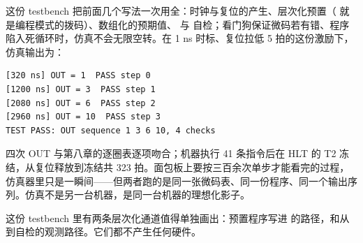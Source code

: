 这份 testbench 把前面几个写法一次用全：时钟与复位的产生、层次化预置（ 就是编程模式的拨码）、数组化的预期值、 与  自检；看门狗保证微码若有错、程序陷入死循环时，仿真不会无限空转。在 1 ns 时标、复位拉低 5 拍的这份激励下，仿真输出为：

\begin{lstlisting}
[320 ns] OUT = 1  PASS step 0
[1200 ns] OUT = 3  PASS step 1
[2080 ns] OUT = 6  PASS step 2
[2960 ns] OUT = 10  PASS step 3
TEST PASS: OUT sequence 1 3 6 10, 4 checks
\end{lstlisting}

四次 OUT 与第八章的逐圈表逐项吻合；机器执行 41 条指令后在 HLT 的 T2 冻结，从复位释放到冻结共 323 拍。面包板上要按三百余次单步才能看完的过程，仿真器里只是一瞬间——但两者跑的是同一张微码表、同一份程序、同一个输出序列。仿真不是另一台机器，是同一台机器的理想化影子。

这份 testbench 里有两条层次化通道值得单独画出：预置程序写进  的路径，和从  到自检的观测路径。它们都不产生任何硬件。

